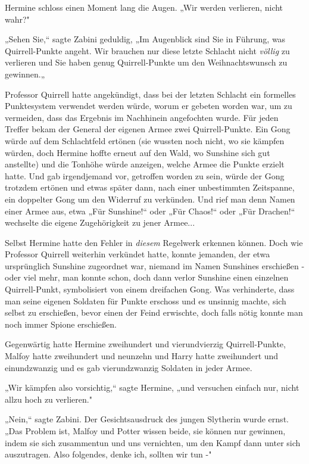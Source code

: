 {Hermine schloss einen Moment lang die Augen. „Wir werden verlieren, nicht wahr?"

„Sehen Sie,“ sagte Zabini geduldig, „Im Augenblick sind Sie in Führung, was Quirrell-Punkte angeht. Wir brauchen nur diese letzte Schlacht nicht \emph{völlig} zu verlieren und Sie haben genug Quirrell-Punkte um den Weihnachtswunsch zu gewinnen.„

Professor Quirrell hatte angekündigt, dass bei der letzten Schlacht ein formelles Punktesystem verwendet werden würde, worum er gebeten worden war, um zu vermeiden, dass das Ergebnis im Nachhinein angefochten wurde. Für jeden Treffer bekam der General der eigenen Armee zwei Quirrell-Punkte. Ein Gong würde auf dem Schlachtfeld ertönen (sie wussten noch nicht, wo sie kämpfen würden, doch Hermine hoffte erneut auf den Wald, wo Sunshine sich gut anstellte) und die Tonhöhe würde anzeigen, welche Armee die Punkte erzielt hatte. Und gab irgendjemand vor, getroffen worden zu sein, würde der Gong trotzdem ertönen und etwas später dann, nach einer unbestimmten Zeitspanne, ein doppelter Gong um den Widerruf zu verkünden. Und rief man denn Namen einer Armee aus, etwa „Für Sunshine!“ oder „Für Chaos!“ oder „Für Drachen!“ wechselte die eigene Zugehörigkeit zu jener Armee...

Selbst Hermine hatte den Fehler in \emph{diesem} Regelwerk erkennen können. Doch wie Professor Quirrell weiterhin verkündet hatte, konnte jemanden, der etwa ursprünglich Sunshine zugeordnet war, niemand im Namen Sunshines erschießen - oder viel mehr, man konnte schon, doch dann verlor Sunshine einen einzelnen Quirrell-Punkt, symbolisiert von einem dreifachen Gong. Was verhinderte, dass man seine eigenen Soldaten für Punkte erschoss und es unsinnig machte, sich selbst zu erschießen, bevor einen der Feind erwischte, doch falls nötig konnte man noch immer Spione erschießen.

Gegenwärtig hatte Hermine zweihundert und vierundvierzig Quirrell-Punkte, Malfoy hatte zweihundert und neunzehn und Harry hatte zweihundert und einundzwanzig und es gab vierundzwanzig Soldaten in jeder Armee.

„Wir kämpfen also vorsichtig,“ sagte Hermine, „und versuchen einfach nur, nicht allzu hoch zu verlieren."

„Nein,“ sagte Zabini. Der Gesichtsausdruck des jungen Slytherin wurde ernst. „Das Problem ist, Malfoy und Potter wissen beide, sie können nur gewinnen, indem sie sich zusammentun und uns vernichten, um den Kampf dann unter sich auszutragen. Also folgendes, denke ich, sollten wir tun -"

}
